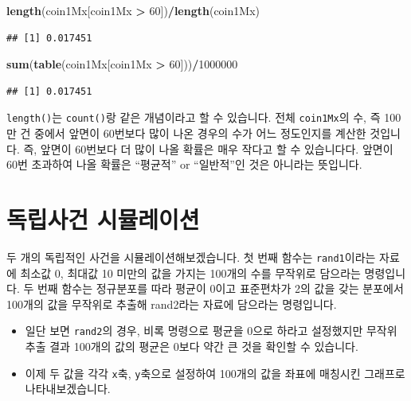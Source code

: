 \documentclass[]{book}
\newenvironment{Shaded}{\begin{snugshade}}{\end{snugshade}}
\newcommand{\DecValTok}[1]{\textcolor[rgb]{0.00,0.00,0.81}{#1}}
\newcommand{\KeywordTok}[1]{\textcolor[rgb]{0.13,0.29,0.53}{\textbf{#1}}}
\newcommand{\NormalTok}[1]{#1}
\newcommand{\OperatorTok}[1]{\textcolor[rgb]{0.81,0.36,0.00}{\textbf{#1}}}
\newcommand{\StringTok}[1]{\textcolor[rgb]{0.31,0.60,0.02}{#1}}
\providecommand{\tightlist}{%
  \setlength{\itemsep}{0pt}\setlength{\parskip}{0pt}}
\begin{document}
\begin{Shaded}
\begin{Highlighting}[]
\KeywordTok{length}\NormalTok{(coin1Mx[coin1Mx }\OperatorTok{>}\StringTok{ }\DecValTok{60}\NormalTok{])}\OperatorTok{/}\KeywordTok{length}\NormalTok{(coin1Mx)}
\end{Highlighting}
\end{Shaded}

\begin{verbatim}
## [1] 0.017451
\end{verbatim}

\begin{Shaded}
\begin{Highlighting}[]
\KeywordTok{sum}\NormalTok{(}\KeywordTok{table}\NormalTok{(coin1Mx[coin1Mx }\OperatorTok{>}\StringTok{ }\DecValTok{60}\NormalTok{]))}\OperatorTok{/}\DecValTok{1000000}
\end{Highlighting}
\end{Shaded}

\begin{verbatim}
## [1] 0.017451
\end{verbatim}

\texttt{length()}는 \texttt{count()}랑 같은 개념이라고 할 수 있습니다. 전체 \texttt{coin1Mx}의 수, 즉 100만 건 중에서 앞면이 60번보다 많이 나온 경우의 수가 어느 정도인지를 계산한 것입니다. 즉, 앞면이 60번보다 더 많이 나올 확률은 매우 작다고 할 수 있습니다다. 앞면이 60번 초과하여 나올 확률은 ``평균적'' or ``일반적''인 것은 아니라는 뜻입니다.

\hypertarget{uxb3c5uxb9bduxc0acuxac74-uxc2dcuxbbacuxb808uxc774uxc158}{%
\section{독립사건 시뮬레이션}\label{uxb3c5uxb9bduxc0acuxac74-uxc2dcuxbbacuxb808uxc774uxc158}}

두 개의 독립적인 사건을 시뮬레이션해보겠습니다. 첫 번째 함수는 \texttt{rand1}이라는 자료에 최소값 0, 최대값 10 미만의 값을 가지는 100개의 수를 무작위로 담으라는 명령입니다. 두 번째 함수는 정규분포를 따라 평균이 0이고 표준편차가 2의 값을 갖는 분포에서 100개의 값을 무작위로 추출해 rand2라는 자료에 담으라는 명령입니다.

\begin{itemize}
\tightlist
\item
  일단 보면 \texttt{rand2}의 경우, 비록 명령으로 평균을 0으로 하라고 설정했지만 무작위 추출 결과 100개의 값의 평균은 0보다 약간 큰 것을 확인할 수 있습니다.
\item
  이제 두 값을 각각 \texttt{x}축, \texttt{y}축으로 설정하여 100개의 값을 좌표에 매칭시킨 그래프로 나타내보겠습니다.
\end{itemize}
\end{document}
